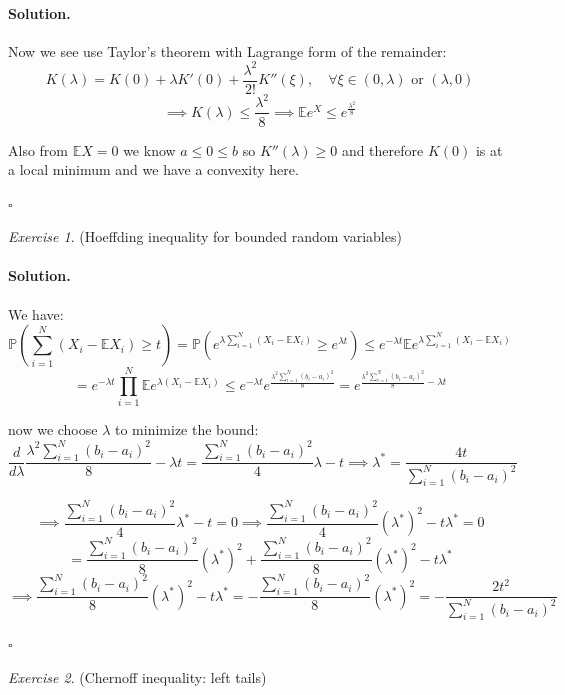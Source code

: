 \documentclass[11pt]{article}
\theoremstyle{definition}
\theoremstyle{remark}
\newtheorem{exercise}{Exercise}[section]
\newenvironment{solution}{\paragraph{Solution.}}{\hfill$\square$\medskip}
\newcommand{\E}{\mathbb{E}}
\newcommand{\Prob}{\mathbb{P}}
\newcommand{\1}{\mathbf{1}}
\begin{document}
\begin{solution}
\begin{enumerate}
		 
		 Now we see use Taylor's theorem with Lagrange form of the remainder:
		 \[
		 K(\lambda) = K(0) + \lambda K'(0) + \frac{\lambda^2}{2!}K''(\xi), \quad \forall \xi \in (0, \lambda) \text{ or } (\lambda, 0)
		 \]
	\[
	\implies  K(\lambda) \leq \frac{\lambda^2}{8} \implies \E e^X \leq e^\frac{\lambda^2}{8}
	\]
	
	Also from \(\E X = 0\) we know \(a \leq 0 \leq b\) so \(K''(\lambda) \geq 0\) and therefore \(K(0)\) is at a local minimum and we have a convexity here.
	
	\end{enumerate}
\end{solution}




\begin{exercise}
	(Hoeffding inequality for bounded random variables)
\end{exercise}

\begin{solution}
	
	We have:
	\[
	\Prob( \sum_{i=1}^{N}( X_i - \E X_i) \geq t) = 
		\Prob( e^{\lambda \sum_{i=1}^{N}( X_i - \E X_i) }\geq e^{\lambda t}) \leq e^{- \lambda t} \E e^{\lambda \sum_{i=1}^{N}( X_i - \E X_i)} 
	\]
	\[
	=  e^{-\lambda t} \prod_{i=1}^{N} \E e^{\lambda( X_i - \E X_i)} 
	\leq e^{-\lambda t} e^{\frac{ \lambda^2 \sum_{i=1}^{N} (b_i-a_i)^2}{8}} =  e^{\frac{ \lambda^2 \sum_{i=1}^{N} (b_i-a_i)^2}{8} -\lambda t} 
	\]
	
	now we choose \(\lambda\) to minimize the bound:
	\[
	\frac{d}{d \lambda} \frac{ \lambda^2 \sum_{i=1}^{N} (b_i-a_i)^2}{8} -\lambda t = \frac{\sum_{i=1}^{N} (b_i-a_i)^2}{4} \lambda - t \implies \lambda^* = \frac{4t}{\sum_{i=1}^{N} (b_i-a_i)^2}
	\]
	
	\[
	\implies \frac{\sum_{i=1}^{N} (b_i-a_i)^2}{4} \lambda^* - t = 0 
	\implies \frac{\sum_{i=1}^{N} (b_i-a_i)^2}{4} (\lambda^*)^2 - t \lambda^* = 0
	\]
	\[
	= \frac{\sum_{i=1}^{N} (b_i-a_i)^2}{8} (\lambda^*)^2 + \frac{\sum_{i=1}^{N} (b_i-a_i)^2}{8} (\lambda^*)^2 - t \lambda^*
	\]
	\[
	\implies  \frac{\sum_{i=1}^{N} (b_i-a_i)^2}{8} (\lambda^*)^2 - t \lambda^* =  - \frac{\sum_{i=1}^{N} (b_i-a_i)^2}{8} (\lambda^*)^2 = -\frac{2t^2}{ \sum_{i=1}^{N} (b_i-a_i)^2 }
	\]
	
\end{solution}

\begin{exercise}
	(Chernoff inequality: left tails)
\end{exercise}
	
\end{document}
